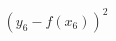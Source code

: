 \documentclass[preview]{standalone}
\begin{document}
\begin{align*}
(y_6 - f(x_6))^2
\end{align*}
\end{document}
